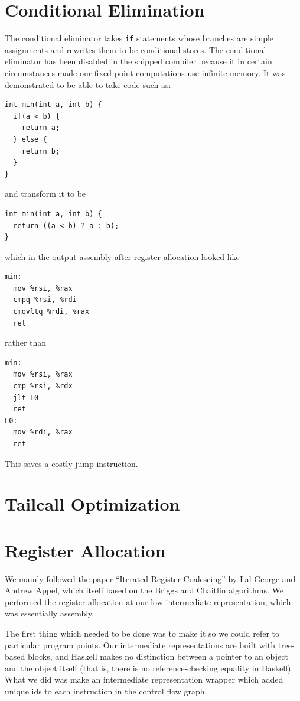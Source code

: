 \documentclass[11pt]{article}
\begin{document}

\section {Conditional Elimination} 
\label{sec:condelim}

The conditional eliminator takes \texttt{if} statements whose branches
are simple assignments and rewrites them to be conditional stores.
The conditional eliminator has been disabled in the shipped compiler
because it in certain circumstances made our fixed point computations
use infinite memory.  It was demonstrated to be able to take code such
as:
\begin{verbatim}
int min(int a, int b) {
  if(a < b) {
    return a;
  } else {
    return b;
  }
}
\end{verbatim}
and transform it to be
\begin{verbatim}
int min(int a, int b) {
  return ((a < b) ? a : b);
}
\end{verbatim}
which in the output assembly after register allocation looked like
\begin{verbatim}
min:
  mov %rsi, %rax
  cmpq %rsi, %rdi
  cmovltq %rdi, %rax
  ret
\end{verbatim}
rather than
\begin{verbatim}
min:
  mov %rsi, %rax
  cmp %rsi, %rdx
  jlt L0
  ret
L0:
  mov %rdi, %rax
  ret
\end{verbatim}

This saves a costly jump instruction.

\section {Tailcall Optimization} 
\label{sec:tailcall}

\section {Register Allocation}
\label{sec:regalloc}

We mainly followed the paper ``Iterated Register Coalescing'' by Lal
George and Andrew Appel, which itself based on the Briggs and Chaitlin
algorithms.  We performed the register allocation at our low
intermediate representation, which was essentially assembly.

The first thing which needed to be done was to make it so we could
refer to particular program points.  Our intermediate representations
are built with tree-based blocks, and Haskell makes no distinction
between a pointer to an object and the object itself (that is, there
is no reference-checking equality in Haskell).  What we did was make
an intermediate representation wrapper which added unique ids to each
instruction in the control flow graph.
\end{document}
